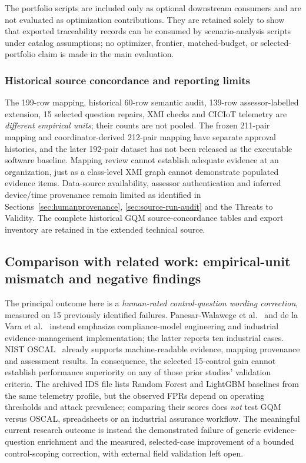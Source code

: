 \documentclass[12pt,a4paper]{article}
\begin{document}
The portfolio scripts are included only as optional downstream consumers and are not evaluated as optimization contributions. They are retained solely to show that exported traceability records can be consumed by scenario-analysis scripts under catalog assumptions; no optimizer, frontier, matched-budget, or selected-portfolio claim is made in the main evaluation.


\subsubsection{Historical source concordance and reporting limits}
\label{sec:semantic-val}
The 199-row mapping, historical 60-row semantic audit, 139-row assessor-labelled extension, 15 selected question repairs, XMI checks and CICIoT telemetry are \emph{different empirical units}; their counts are not pooled. The frozen 211-pair mapping and coordinator-derived 212-pair mapping have separate approval histories, and the later 192-pair dataset has not been released as the executable software baseline. Mapping review cannot establish adequate evidence at an organization, just as a class-level XMI graph cannot demonstrate populated evidence items. Data-source availability, assessor authentication and inferred device/time provenance remain limited as identified in Sections~\ref{sec:humanprovenance}, \ref{sec:source-run-audit} and the Threats to Validity. The complete historical GQM source-concordance tables and export inventory are retained in the extended technical source.

\subsection{Comparison with related work: empirical-unit mismatch and negative findings}
\label{sec:empirical-unit-comparison}
The principal outcome here is a \emph{human-rated control-question wording correction}, measured on 15 previously identified failures. Panesar-Walawege et al.~\cite{PanesarWalawege2013IST} and de la Vara et al.~\cite{DelaVara2016IST,DelaVara2022SoSyM} instead emphasize compliance-model engineering and industrial evidence-management implementation; the latter reports ten industrial cases. NIST OSCAL~\cite{NIST_OSCAL_2026,NIST_OSCAL_ControlMapping_Online} already supports machine-readable evidence, mapping provenance and assessment results. In consequence, the selected 15-control gain cannot establish performance superiority on any of those prior studies' validation criteria. The archived IDS file lists Random Forest and LightGBM baselines from the same telemetry profile, but the observed FPRs depend on operating thresholds and attack prevalence; comparing their scores does \emph{not} test GQM versus OSCAL, spreadsheets or an industrial assurance workflow. The meaningful current research outcome is instead the demonstrated failure of generic evidence-question enrichment and the measured, selected-case improvement of a bounded control-scoping correction, with external field validation left open.
\end{document}
